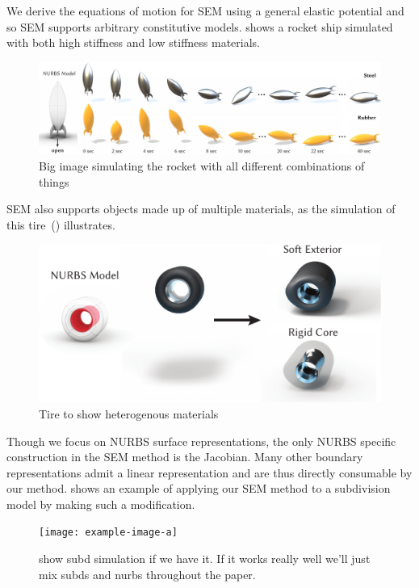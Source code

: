 We derive the equations of motion for SEM using a general elastic potential and so SEM supports arbitrary constitutive models.  shows a 
rocket ship simulated with both high stiffness and low stiffness materials. 
\begin{figure}[htp]
  \includegraphics[width=\textwidth]{figures/rocket.pdf}
  \caption{Big image simulating the rocket with all different combinations of things}
  \label{fig:rocket}
\end{figure}

SEM also supports objects made up of multiple materials, as the simulation of this tire~() illustrates.
\begin{figure}[h]
  \includegraphics[width=\columnwidth]{figures/tire}
  \caption{Tire to show heterogenous materials}
  \label{fig:tire}
\end{figure}


Though we focus on NURBS surface representations, the only NURBS specific construction in the SEM method is the Jacobian.
Many other boundary representations admit a linear representation and are thus directly consumable by our method.
 shows an example of applying our SEM method to a subdivision model by making such a modification.
\begin{figure}[h]
  \texttt{[image: example-image-a]}
  \caption{show subd simulation if we have it. If it works really well we'll just mix subds and nurbs throughout the paper. }
  \label{fig:subd}
\end{figure}

